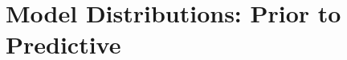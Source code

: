 \documentclass[aspectratio=169]{beamer}
\begin{document}
\begin{frame}


\end{frame}









\section{Model Distributions: Prior to Predictive}
\end{document}

